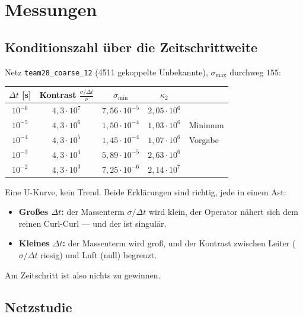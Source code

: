 \documentclass[11pt,a4paper]{article}
\newcommand{\code}[1]{\texttt{\small #1}}
\newcommand{\kappazwei}{\kappa_2}
\begin{document}
\section{Messungen}

\subsection{Konditionszahl über die Zeitschrittweite}

Netz \code{team28\_coarse\_12} (4511 gekoppelte Unbekannte), $\sigma_{\max}$
durchweg $155$:

\begin{center}
\begin{tabular}{ccccl}
\toprule
$\Delta t$ [s] & Kontrast $\frac{\sigma/\Delta t}{\nu}$ & $\sigma_{\min}$ &
$\kappazwei$ & \\
\midrule
$10^{-6}$ & $4{,}3\cdot10^{7}$ & $7{,}56\cdot10^{-5}$ & $2{,}05\cdot10^{6}$ & \\
$10^{-5}$ & $4{,}3\cdot10^{6}$ & $1{,}50\cdot10^{-4}$ & $1{,}03\cdot10^{6}$ & Minimum \\
$10^{-4}$ & $4{,}3\cdot10^{5}$ & $1{,}45\cdot10^{-4}$ & $1{,}07\cdot10^{6}$ & Vorgabe \\
$10^{-3}$ & $4{,}3\cdot10^{4}$ & $5{,}89\cdot10^{-5}$ & $2{,}63\cdot10^{6}$ & \\
$10^{-2}$ & $4{,}3\cdot10^{3}$ & $7{,}25\cdot10^{-6}$ & $2{,}14\cdot10^{7}$ & \\
\bottomrule
\end{tabular}
\end{center}

\noindent
Eine U-Kurve, kein Trend. Beide Erklärungen sind richtig, jede in einem Ast:
\begin{itemize}
\item \textbf{Großes $\Delta t$:} der Massenterm $\sigma/\Delta t$ wird klein,
  der Operator nähert sich dem reinen Curl-Curl --- und der ist singulär.
\item \textbf{Kleines $\Delta t$:} der Massenterm wird groß, und der Kontrast
  zwischen Leiter ($\sigma/\Delta t$ riesig) und Luft (null) begrenzt.
\end{itemize}
Am Zeitschritt ist also nichts zu gewinnen.

\subsection{Netzstudie}
\end{document}
